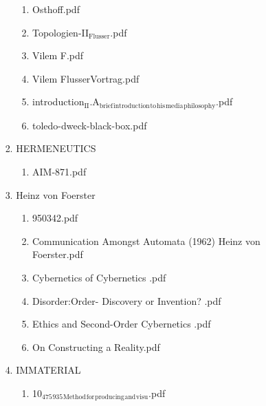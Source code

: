 \documentclass[11pt]{article}
\begin{document}
\begin{enumerate}
\begin{enumerate}
\begin{enumerate}
\begin{enumerate}
\begin{enumerate}
\item Osthoff.pdf
\label{sec-1-1-1-1-7-3-27-7}

\item Topologien-II$_{\text{Flusser}}$.pdf
\label{sec-1-1-1-1-7-3-27-8}

\item Vilem F.pdf
\label{sec-1-1-1-1-7-3-27-9}

\item Vilem FlusserVortrag.pdf
\label{sec-1-1-1-1-7-3-27-10}

\item introduction$_{\text{II}}$.A$_{\text{brief}}$$_{\text{introduction}}$$_{\text{to}}$$_{\text{his}}$$_{\text{media}}$$_{\text{philosophy}}$.pdf
\label{sec-1-1-1-1-7-3-27-11}

\item toledo-dweck-black-box.pdf
\label{sec-1-1-1-1-7-3-27-12}
\end{enumerate}

\item HERMENEUTICS
\label{sec-1-1-1-1-7-3-28}
\begin{enumerate}
\item AIM-871.pdf
\label{sec-1-1-1-1-7-3-28-1}
\end{enumerate}

\item Heinz von Foerster
\label{sec-1-1-1-1-7-3-29}
\begin{enumerate}
\item 950342.pdf
\label{sec-1-1-1-1-7-3-29-1}

\item Communication Amongst Automata (1962)  Heinz von Foerster.pdf
\label{sec-1-1-1-1-7-3-29-2}

\item Cybernetics of Cybernetics .pdf
\label{sec-1-1-1-1-7-3-29-3}

\item Disorder:Order-  Discovery or Invention? .pdf
\label{sec-1-1-1-1-7-3-29-4}

\item Ethics and Second-Order Cybernetics .pdf
\label{sec-1-1-1-1-7-3-29-5}

\item On Constructing a Reality.pdf
\label{sec-1-1-1-1-7-3-29-6}
\end{enumerate}

\item IMMATERIAL
\label{sec-1-1-1-1-7-3-30}
\begin{enumerate}
\item 10$_{\text{475}}$$_{\text{935}}$$_{\text{Method}}$$_{\text{for}}$$_{\text{producing}}$$_{\text{and}}$$_{\text{visu}}$.pdf
\label{sec-1-1-1-1-7-3-30-1}


\end{enumerate}
\end{enumerate}
\end{enumerate}
\end{enumerate}
\end{enumerate}
\end{document}
